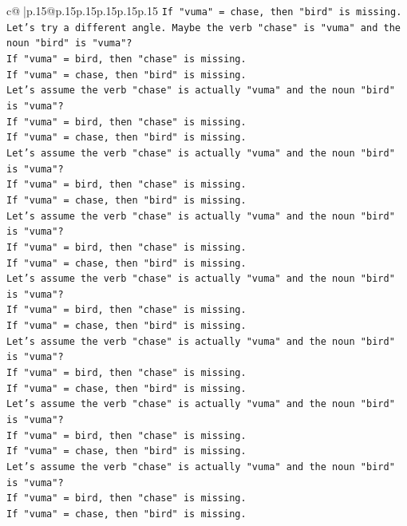 \documentclass{article}
\begin{document}
{\begin{supertabular}{c@{$\;$}|p{.15\linewidth}@{}p{.15\linewidth}p{.15\linewidth}p{.15\linewidth}p{.15\linewidth}p{.15\linewidth}}
{{{\texttt{If "vuma" = chase, then "bird" is missing.} \\
\texttt{Let's try a different angle. Maybe the verb "chase" is "vuma" and the noun "bird" is "vuma"?} \\
\texttt{If "vuma" = bird, then "chase" is missing.} \\
\texttt{If "vuma" = chase, then "bird" is missing.} \\
\texttt{Let's assume the verb "chase" is actually "vuma" and the noun "bird" is "vuma"?} \\
\texttt{If "vuma" = bird, then "chase" is missing.} \\
\texttt{If "vuma" = chase, then "bird" is missing.} \\
\texttt{Let's assume the verb "chase" is actually "vuma" and the noun "bird" is "vuma"?} \\
\texttt{If "vuma" = bird, then "chase" is missing.} \\
\texttt{If "vuma" = chase, then "bird" is missing.} \\
\texttt{Let's assume the verb "chase" is actually "vuma" and the noun "bird" is "vuma"?} \\
\texttt{If "vuma" = bird, then "chase" is missing.} \\
\texttt{If "vuma" = chase, then "bird" is missing.} \\
\texttt{Let's assume the verb "chase" is actually "vuma" and the noun "bird" is "vuma"?} \\
\texttt{If "vuma" = bird, then "chase" is missing.} \\
\texttt{If "vuma" = chase, then "bird" is missing.} \\
\texttt{Let's assume the verb "chase" is actually "vuma" and the noun "bird" is "vuma"?} \\
\texttt{If "vuma" = bird, then "chase" is missing.} \\
\texttt{If "vuma" = chase, then "bird" is missing.} \\
\texttt{Let's assume the verb "chase" is actually "vuma" and the noun "bird" is "vuma"?} \\
\texttt{If "vuma" = bird, then "chase" is missing.} \\
\texttt{If "vuma" = chase, then "bird" is missing.} \\
\texttt{Let's assume the verb "chase" is actually "vuma" and the noun "bird" is "vuma"?} \\
\texttt{If "vuma" = bird, then "chase" is missing.} \\
\texttt{If "vuma" = chase, then "bird" is missing.} \\
}}}
\end{supertabular}}
\end{document}
